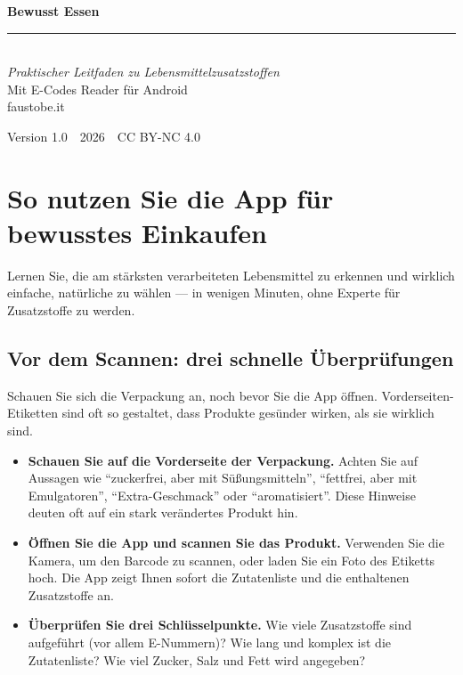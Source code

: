 \documentclass[a5paper,12pt,oneside,openany]{book}
\begin{document}
\begin{titlepage}
\pagecolor{verdescuro}
\color{white}
\vspace*{2.5cm}
\begin{center}
  {\fontsize{38}{44}\selectfont\bfseries Bewusst Essen}\\[1.2cm]
  \textcolor{verdecharo}{\rule{6cm}{0.6pt}}\\[1.2cm]
  {\large\itshape Praktischer Leitfaden zu Lebensmittelzusatzstoffen}\\[0.6cm]
  {\normalsize Mit E-Codes Reader f\"{u}r Android}\\[3cm]
  {\normalsize\textcolor{verdecharo}{faustobe.it}}
\end{center}
\vfill
\begin{center}
  {\small Version 1.0\ \textbullet\ 2026\ \textbullet\ CC BY-NC 4.0}
\end{center}
\end{titlepage}
\nopagecolor

\frontmatter
\tableofcontents
\mainmatter

\chapter{So nutzen Sie die App f\"{u}r bewusstes Einkaufen}

Lernen Sie, die am st\"{a}rksten verarbeiteten Lebensmittel zu erkennen und
wirklich einfache, nat\"{u}rliche zu w\"{a}hlen --- in wenigen Minuten,
ohne Experte f\"{u}r Zusatzstoffe zu werden.

\section{Vor dem Scannen: drei schnelle \"{U}berpr\"{u}fungen}

Schauen Sie sich die Verpackung an, noch bevor Sie die App \"{o}ffnen.
Vorderseiten-Etiketten sind oft so gestaltet, dass Produkte ges\"{u}nder
wirken, als sie wirklich sind.

\begin{itemize}
  \item \textbf{Schauen Sie auf die Vorderseite der Verpackung.} Achten Sie
    auf Aussagen wie ``zuckerfrei, aber mit S\"{u}{\ss}ungsmitteln'',
    ``fettfrei, aber mit Emulgatoren'', ``Extra-Geschmack'' oder
    ``aromatisiert''. Diese Hinweise deuten oft auf ein stark ver\"{a}ndertes
    Produkt hin.
  \item \textbf{\"{O}ffnen Sie die App und scannen Sie das Produkt.} Verwenden
    Sie die Kamera, um den Barcode zu scannen, oder laden Sie ein Foto des
    Etiketts hoch. Die App zeigt Ihnen sofort die Zutatenliste und die
    enthaltenen Zusatzstoffe an.
  \item \textbf{\"{U}berpr\"{u}fen Sie drei Schl\"{u}sselpunkte.} Wie viele
    Zusatzstoffe sind aufgef\"{u}hrt (vor allem E-Nummern)? Wie lang und
    komplex ist die Zutatenliste? Wie viel Zucker, Salz und Fett wird angegeben?
\end{itemize}
\end{document}
